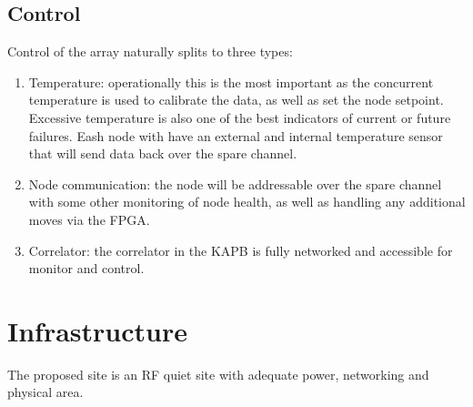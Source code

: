 \documentclass[11pt]{article}
\begin{document}
\subsection{Control}
Control of the array naturally splits to three types:
\begin{enumerate}
\item Temperature:  operationally this is the most important as the concurrent temperature is used to calibrate the data, as well as set the node setpoint.  Excessive temperature is also one of the best indicators of current or future failures.  Eash node with have an external and internal temperature sensor that will send data back over the spare channel.
\item Node communication:  the node will be addressable over the spare channel with some other monitoring of node health, as well as handling any additional moves via the FPGA.
\item Correlator:  the correlator in the KAPB is fully networked and accessible for monitor and control.
\end{enumerate}

\section{Infrastructure}
The proposed site is an RF quiet site with adequate power, networking and physical area.  



\end{document}
